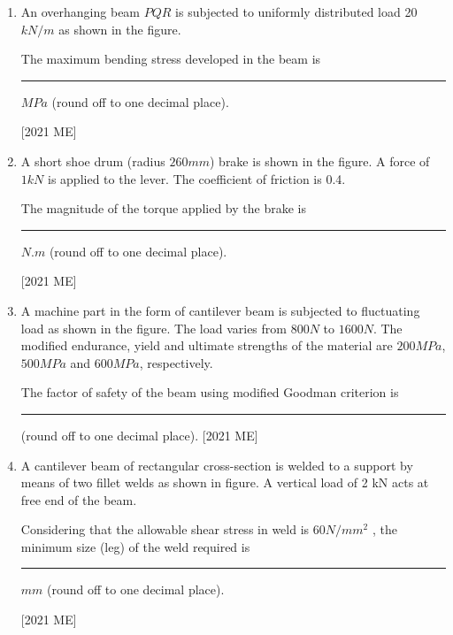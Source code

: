 \documentclass[journal]{IEEEtran}
\begin{document}
\begin{enumerate}
\hfill [2021 ME]
\item An overhanging beam $PQR$ is subjected to uniformly distributed load 20
$kN/m$ as shown in the figure. 

The maximum bending stress developed in the beam is \rule{2cm}{0.4pt} $MPa$ (round off to one decimal place).

\hfill [2021 ME]

\item A short shoe drum (radius $260 mm$) brake is shown in the figure. A force of
$1 kN$ is applied to the lever. The coefficient of friction is 0.4. 
 
The magnitude of the torque applied by the brake is \rule{2cm}{0.4pt}$N.m$ (round off to one decimal place). 

\hfill [2021 ME]
\item A machine part in the form of cantilever beam is subjected to fluctuating
load as shown in the figure. The load varies from $800 N$ to $1600 N$. The
modified endurance, yield and ultimate strengths of the material are $200
MPa$, $500 MPa$ and $600 MPa$, respectively. 

The factor of safety of the beam using modified Goodman criterion is \rule{2cm}{0.4pt} (round off to one decimal place).
\hfill [2021 ME]
\item A cantilever beam of rectangular cross-section is welded to a support by
means of two fillet welds as shown in figure. A vertical load of 2 kN acts at
free end of the beam. 

Considering that the allowable shear stress in weld is $60 N/mm^2$
, the
minimum size (leg) of the weld required is \rule{2cm}{0.4pt} $mm$ (round off to one
decimal place).

\hfill [2021 ME]
\end{enumerate}
\end{document}
